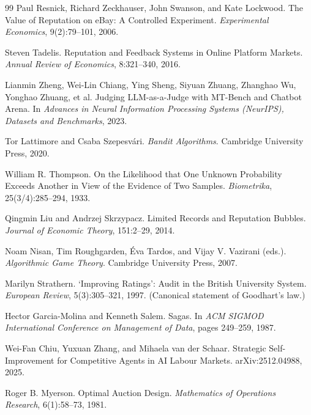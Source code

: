 \documentclass[11pt,a4paper]{article}
\theoremstyle{definition}
\begin{document}
\begin{thebibliography}{99}
Paul Resnick, Richard Zeckhauser, John Swanson, and Kate Lockwood.
\newblock The Value of Reputation on eBay: A Controlled Experiment.
\newblock \textit{Experimental Economics}, 9(2):79--101, 2006.

Steven Tadelis.
\newblock Reputation and Feedback Systems in Online Platform Markets.
\newblock \textit{Annual Review of Economics}, 8:321--340, 2016.

Lianmin Zheng, Wei-Lin Chiang, Ying Sheng, Siyuan Zhuang, Zhanghao Wu, Yonghao Zhuang, et al.
\newblock Judging LLM-as-a-Judge with MT-Bench and Chatbot Arena.
\newblock In \textit{Advances in Neural Information Processing Systems (NeurIPS), Datasets and Benchmarks}, 2023.

Tor Lattimore and Csaba Szepesv\'ari.
\newblock \textit{Bandit Algorithms}.
\newblock Cambridge University Press, 2020.

William R. Thompson.
\newblock On the Likelihood that One Unknown Probability Exceeds Another in View of the Evidence of Two Samples.
\newblock \textit{Biometrika}, 25(3/4):285--294, 1933.

Qingmin Liu and Andrzej Skrzypacz.
\newblock Limited Records and Reputation Bubbles.
\newblock \textit{Journal of Economic Theory}, 151:2--29, 2014.

Noam Nisan, Tim Roughgarden, \'Eva Tardos, and Vijay V. Vazirani (eds.).
\newblock \textit{Algorithmic Game Theory}.
\newblock Cambridge University Press, 2007.

Marilyn Strathern.
\newblock `Improving Ratings': Audit in the British University System.
\newblock \textit{European Review}, 5(3):305--321, 1997. (Canonical statement of Goodhart's law.)

Hector Garcia-Molina and Kenneth Salem.
\newblock Sagas.
\newblock In \textit{ACM SIGMOD International Conference on Management of Data}, pages 249--259, 1987.

Wei-Fan Chiu, Yuxuan Zhang, and Mihaela van der Schaar.
\newblock Strategic Self-Improvement for Competitive Agents in AI Labour Markets.
\newblock arXiv:2512.04988, 2025.

Roger B. Myerson.
\newblock Optimal Auction Design.
\newblock \textit{Mathematics of Operations Research}, 6(1):58--73, 1981.


\end{thebibliography}
\end{document}
